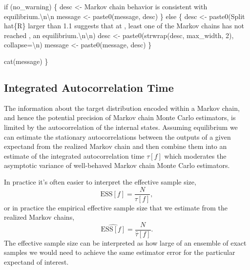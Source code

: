 \documentclass[
  letterpaper,
  DIV=11,
  numbers=noendperiod]{scrartcl}
\newenvironment{Shaded}{\begin{snugshade}}{\end{snugshade}}
\newcommand{\AttributeTok}[1]{\textcolor[rgb]{0.40,0.45,0.13}{#1}}
\newcommand{\ControlFlowTok}[1]{\textcolor[rgb]{0.00,0.23,0.31}{#1}}
\newcommand{\DecValTok}[1]{\textcolor[rgb]{0.68,0.00,0.00}{#1}}
\newcommand{\FunctionTok}[1]{\textcolor[rgb]{0.28,0.35,0.67}{#1}}
\newcommand{\NormalTok}[1]{\textcolor[rgb]{0.00,0.23,0.31}{#1}}
\newcommand{\OtherTok}[1]{\textcolor[rgb]{0.00,0.23,0.31}{#1}}
\newcommand{\SpecialCharTok}[1]{\textcolor[rgb]{0.37,0.37,0.37}{#1}}
\newcommand{\StringTok}[1]{\textcolor[rgb]{0.13,0.47,0.30}{#1}}
\begin{document}
\begin{Shaded}
\begin{Highlighting}[]
  \ControlFlowTok{if}\NormalTok{ (no\_warning) \{}
\NormalTok{    desc }\OtherTok{\textless{}{-}} \StringTok{\textquotesingle{}Markov chain behavior is consistent with equilibrium.}\SpecialCharTok{\textbackslash{}n\textbackslash{}n}\StringTok{\textquotesingle{}}
\NormalTok{    message }\OtherTok{\textless{}{-}} \FunctionTok{paste0}\NormalTok{(message, desc)}
\NormalTok{  \} }\ControlFlowTok{else}\NormalTok{ \{}
\NormalTok{    desc }\OtherTok{\textless{}{-}} \FunctionTok{paste0}\NormalTok{(}\StringTok{\textquotesingle{}Split hat\{R\} larger than 1.1 suggests that at \textquotesingle{}}\NormalTok{,}
                   \StringTok{\textquotesingle{}least one of the Markov chains has not reached \textquotesingle{}}\NormalTok{,}
                   \StringTok{\textquotesingle{}an equilibrium.}\SpecialCharTok{\textbackslash{}n\textbackslash{}n}\StringTok{\textquotesingle{}}\NormalTok{)}
\NormalTok{    desc }\OtherTok{\textless{}{-}} \FunctionTok{paste0}\NormalTok{(}\FunctionTok{strwrap}\NormalTok{(desc, max\_width, }\DecValTok{2}\NormalTok{), }\AttributeTok{collapse=}\StringTok{\textquotesingle{}}\SpecialCharTok{\textbackslash{}n}\StringTok{\textquotesingle{}}\NormalTok{)}
\NormalTok{    message }\OtherTok{\textless{}{-}} \FunctionTok{paste0}\NormalTok{(message, desc)}
\NormalTok{  \}}
  
  \FunctionTok{cat}\NormalTok{(message)}
\NormalTok{\}}
\end{Highlighting}
\end{Shaded}

\hypertarget{integrated-autocorrelation-time}{%
\subsection{Integrated Autocorrelation
Time}\label{integrated-autocorrelation-time}}

The information about the target distribution encoded within a Markov
chain, and hence the potential precision of Markov chain Monte Carlo
estimators, is limited by the autocorrelation of the internal states.
Assuming equilibrium we can estimate the stationary autocorrelations
between the outputs of a given expectand from the realized Markov chain
and then combine them into an estimate of the integrated autocorrelation
time \(\tau[f]\) which moderates the asymptotic variance of well-behaved
Markov chain Monte Carlo estimators.

In practice it's often easier to interpret the effective sample size, \[
\text{ESS}[f] = \frac{N}{\tau[f]},
\] or in practice the empirical effective sample size that we estimate
from the realized Markov chains, \[
\hat{\text{ESS}[f]} = \frac{N}{\hat{\tau}[f]}.
\] The effective sample size can be interpreted as how large of an
ensemble of exact samples we would need to achieve the same estimator
error for the particular expectand of interest.
\end{document}
